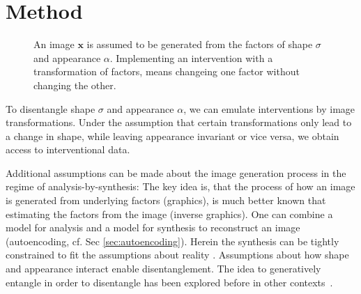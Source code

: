 \chapter{Method}\label{sec:method}

		\begin{figure}[htp]
			\centering
			
			\caption{An image $\mathbf{x}$ is assumed to be generated from the factors of shape $\sigma$ and appearance $\alpha$. Implementing an intervention with a transformation of factors, means changeing one factor without changing the other.}
			\label{fig:intervene}
		\end{figure}
		To disentangle shape $\sigma$ and appearance $\alpha$, we can emulate interventions by image transformations. Under the assumption that certain transformations only lead to a change in shape, while leaving appearance invariant or vice versa, we obtain access to interventional data. %


		Additional assumptions can be made about the image generation process in the regime of analysis-by-synthesis:
		The key idea is, that the process of how an image is generated from underlying factors (graphics), is much better known that estimating the factors from the image (inverse graphics).
		One can combine a model for analysis and a model for synthesis to reconstruct an image (autoencoding, cf. Sec \ref{sec:autoencoding}).
		Herein the synthesis can be tightly constrained to fit the assumptions about reality \cite{tieleman14thesis}.
		Assumptions about how shape and appearance interact enable disentanglement. The idea to generatively entangle in order to disentangle has been explored before in other contexts~\cite{desjardins12genentangle}.



